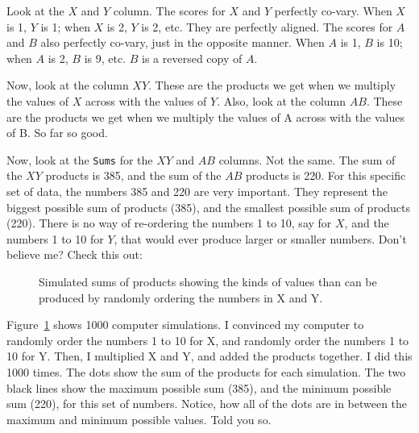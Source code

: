 \documentclass[
  letterpaper,
  DIV=11,
  numbers=noendperiod]{scrreprt}
\begin{document}
Look at the \(X\) and \(Y\) column. The scores for \(X\) and \(Y\)
perfectly co-vary. When \(X\) is 1, \(Y\) is 1; when \(X\) is 2, \(Y\)
is 2, etc. They are perfectly aligned. The scores for \(A\) and \(B\)
also perfectly co-vary, just in the opposite manner. When \(A\) is 1,
\(B\) is 10; when \(A\) is 2, \(B\) is 9, etc. \(B\) is a reversed copy
of \(A\).

Now, look at the column \(XY\). These are the products we get when we
multiply the values of \(X\) across with the values of \(Y\). Also, look
at the column \(AB\). These are the products we get when we multiply the
values of A across with the values of B. So far so good.

Now, look at the \texttt{Sums} for the \(XY\) and \(AB\) columns. Not
the same. The sum of the \(XY\) products is 385, and the sum of the
\(AB\) products is 220. For this specific set of data, the numbers 385
and 220 are very important. They represent the biggest possible sum of
products (385), and the smallest possible sum of products (220). There
is no way of re-ordering the numbers 1 to 10, say for \(X\), and the
numbers 1 to 10 for \(Y\), that would ever produce larger or smaller
numbers. Don't believe me? Check this out:

\begin{figure}


\caption{\label{fig-3simsum}Simulated sums of products showing the kinds
of values than can be produced by randomly ordering the numbers in X and
Y.}

\end{figure}%

Figure~\ref{fig-3simsum} shows 1000 computer simulations. I convinced my
computer to randomly order the numbers 1 to 10 for X, and randomly order
the numbers 1 to 10 for Y. Then, I multiplied X and Y, and added the
products together. I did this 1000 times. The dots show the sum of the
products for each simulation. The two black lines show the maximum
possible sum (385), and the minimum possible sum (220), for this set of
numbers. Notice, how all of the dots are in between the maximum and
minimum possible values. Told you so.
\end{document}
